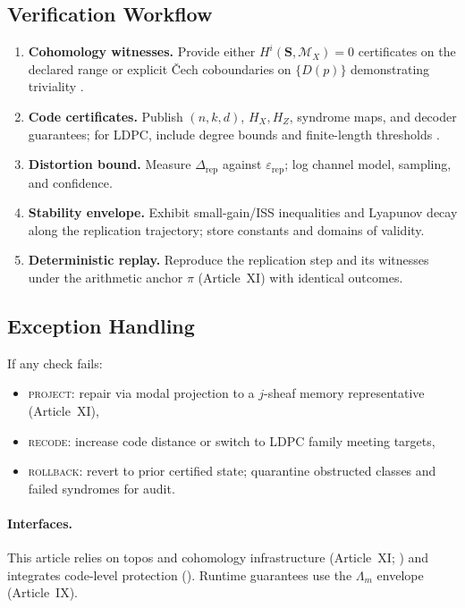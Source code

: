 \documentclass[12pt]{amsart}
\theoremstyle{plain}
\begin{document}
\subsection{Verification Workflow}
\begin{enumerate}
  \item \textbf{Cohomology witnesses.} Provide either $H^i(\mathbf{S},\mathscr{M}_X)=0$ certificates on the declared range or explicit Čech coboundaries on $\{D(p)\}$ demonstrating triviality \cite{hartshorne1977algebraic,maclane1992sheaves,johnstone2002elephant}.
  \item \textbf{Code certificates.} Publish $(n,k,d)$, $H_X,H_Z$, syndrome maps, and decoder guarantees; for LDPC, include degree bounds and finite-length thresholds \cite{calderbank1996good,steane1996multiple,tillich2014quantum}.
  \item \textbf{Distortion bound.} Measure $\Delta_{\mathrm{rep}}$ against $\varepsilon_{\mathrm{rep}}$; log channel model, sampling, and confidence.
  \item \textbf{Stability envelope.} Exhibit small-gain/ISS inequalities and Lyapunov decay along the replication trajectory; store constants and domains of validity.
  \item \textbf{Deterministic replay.} Reproduce the replication step and its witnesses under the arithmetic anchor $\pi$ (Article~XI) with identical outcomes.
\end{enumerate}

\subsection{Exception Handling}
If any check fails:
\begin{itemize}
  \item \textsc{project:} repair via modal projection to a $j$-sheaf memory representative (Article~XI),
  \item \textsc{recode:} increase code distance or switch to LDPC family meeting targets,
  \item \textsc{rollback:} revert to prior certified state; quarantine obstructed classes and failed syndromes for audit.
\end{itemize}

\paragraph{Interfaces.}
This article relies on topos and cohomology infrastructure (Article~XI; \cite{maclane1992sheaves,johnstone2002elephant,hartshorne1977algebraic}) and integrates code-level protection (\cite{calderbank1996good,steane1996multiple,tillich2014quantum}). Runtime guarantees use the $\Lambda_m$ envelope (Article~IX).
\end{document}
